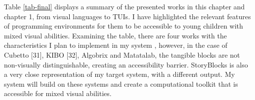 \documentclass[oneside,%
                    author={Malak Hajji},
                    degree={BSc},
                    title={Designing An Accessible Computational Toolkit For Students},
                  subtitle={With Mixed Visual Abilities}]{dissertation}
\begin{document}
Table \ref{tab-final} displays a summary of the presented works in this chapter and chapter 1, from visual languages to TUIs.
I have highlighted the relevant features of programming environments for them to be accessible to young children with mixed visual abilities. 
Examining the table, there are four works with the characteristics I plan to implement in my system , however, in the case of Cubetto [31], KIBO [32], Algobrix and Matatalab, the tangible blocks are not non-visually distinguishable, creating an accessibility barrier. StoryBlocks is also a very close representation of my target system, with a different output. My system will build on these systems and create a computational toolkit that is accessible for mixed visual abilities. 

\end{document}
